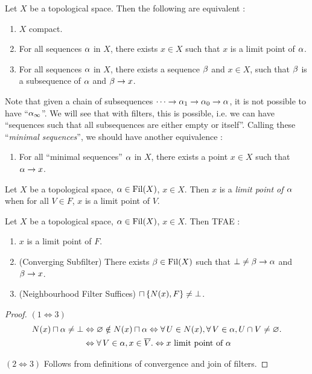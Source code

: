 \documentclass[main.tex]{subfiles}
\begin{document}
\begin{rmk}
  
  Let $X$ be a topological space. 
  Then the following are equivalent : 
  \begin{enumerate}
    \item $X$ compact. 
    \item For all sequences $\alpha$ in $X$, 
    there exists $x \in X$ such that $x$ is a limit point of $\alpha$.
    \item For all sequences $\alpha$ in $X$, 
    there exists a sequence $\beta$ and $x \in X$,
    such that $\beta$ is a subsequence of $\alpha$ and $\beta\to x$.
  \end{enumerate}
  Note that given a chain of subsequences 
  $\cdots \to \alpha_1 \to \alpha_0 \to \alpha$, 
  it is not possible to have ``$\alpha_\infty$''.
  We will see that with filters, 
  this is possible,
  i.e. we can have ``sequences such that all subsequences are either 
  empty or itself''.
  Calling these ``\emph{minimal sequences}'', 
  we should have another equivalence : 
  \begin{enumerate}[resume]
    \item For all ``minimal sequences'' $\alpha$ in $X$,
    there exists a point $x \in X$ such that $\alpha \to x$.
  \end{enumerate}
\end{rmk}

\begin{dfn} 
  
  Let $X$ be a topological space, $\alpha \in \operatorname{Fil}(X)$, $x \in X$.
  Then $x$ is a \emph{limit point of $\alpha$} when
  for all $V \in F$, $x$ is a limit point of $V$.
\end{dfn}

\begin{prop} 
  
  Let $X$ be a topological space, $\alpha \in \operatorname{Fil}(X)$, $x \in X$. 
  Then TFAE : 
  \begin{enumerate}
    \item $x$ is a limit point of $F$.
    \item (Converging Subfilter) There exists $\beta \in \operatorname{Fil}(X)$ such that 
    $\bot \neq \beta \to \alpha$ and $\beta \to x$.
    \item (Neighbourhood Filter Suffices) $\sqcap\left\{N(x),F\right\} \neq \bot$.
  \end{enumerate}
\end{prop}
\begin{proof}
  $(1\iff 3)$
  \begin{align*}
    N(x) \sqcap \alpha \neq \bot
    &\Leftrightarrow \varnothing \notin N(x) \sqcap \alpha
    \Leftrightarrow \forall\, U \in N(x), \forall\, V \in \alpha, U \cap V \neq \varnothing. \\
    &\Leftrightarrow \forall\, V \in \alpha, x \in \overline{V}. 
    \Leftrightarrow x \text{ limit point of } \alpha
  \end{align*} 

  $(2\iff 3)$ Follows from definitions of convergence and join of filters.
\end{proof}
\end{document}
